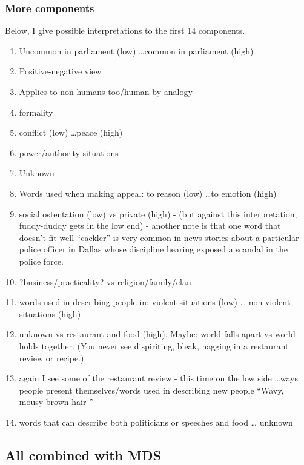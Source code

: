 \documentclass[10pt,letterpaper]{book}
\begin{document}
\subsubsection{More components}

Below, I give possible interpretations to the first 14 components.

\begin{enumerate}
 \item Uncommon in parliament (low) \ldots common in parliament (high)
 \item Positive-negative view
 \item Applies to non-humans too/human by analogy
 \item formality
 \item conflict (low) \ldots peace (high)
 \item power/authority situations
 \item Unknown
 \item Words used when making appeal: to reason (low) \ldots to emotion (high)
 \item social ostentation (low) vs private (high) - (but against this 
       interpretation, fuddy-duddy gets in the low end) - another note is that 
       one word that doesn't fit well ``cackler'' is very common in news 
       stories about a particular police officer in Dallas whose discipline 
       hearing exposed a scandal in the police force.
 \item ?business/practicality? vs religion/family/clan
 \item words used in describing people in: violent situations (low) \ldots 
       non-violent situations (high)
 \item unknown vs restaurant and food (high). Maybe: world falls apart vs world 
       holds together. (You never see dispiriting, bleak, nagging in a 
       restaurant review or recipe.)
 \item again I see some of the restaurant review - this time on the low side 
       \ldots ways people present themselves/words used in describing new 
       people ``Wavy, mousy brown hair ''
 \item words that can describe both politicians or speeches and food \ldots 
       unknown
\end{enumerate}

\subsection{All combined with MDS}
\end{document}
